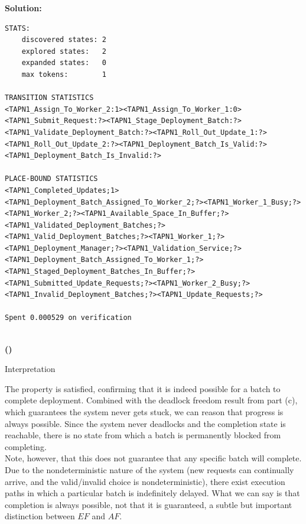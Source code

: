 \documentclass[10pt]{article}
\newenvironment{solution}{
	\vspace{1em}\par\large\textbf{{Solution:}}\par\vspace{1em}
}{
	\vspace{1em}
}
\newcounter{step}
\renewcommand{\thestep}{\Roman{step}}
\newenvironment{step}{
	\refstepcounter{step}
	\vspace{1.5em}\par\noindent\large\textbf{(\thestep)}
}{
	\par
	\vspace{1.5em}
}
\begin{document}
\begin{solution}
\begin{lstlisting}[style=queryoutput]
STATS:
	discovered states: 2
	explored states:   2
	expanded states:   0
	max tokens:        1

TRANSITION STATISTICS
<TAPN1_Assign_To_Worker_2:1><TAPN1_Assign_To_Worker_1:0><TAPN1_Submit_Request:?><TAPN1_Stage_Deployment_Batch:?><TAPN1_Validate_Deployment_Batch:?><TAPN1_Roll_Out_Update_1:?><TAPN1_Roll_Out_Update_2:?><TAPN1_Deployment_Batch_Is_Valid:?><TAPN1_Deployment_Batch_Is_Invalid:?>

PLACE-BOUND STATISTICS
<TAPN1_Completed_Updates;1><TAPN1_Deployment_Batch_Assigned_To_Worker_2;?><TAPN1_Worker_1_Busy;?><TAPN1_Worker_2;?><TAPN1_Available_Space_In_Buffer;?><TAPN1_Validated_Deployment_Batches;?><TAPN1_Valid_Deployment_Batches;?><TAPN1_Worker_1;?><TAPN1_Deployment_Manager;?><TAPN1_Validation_Service;?><TAPN1_Deployment_Batch_Assigned_To_Worker_1;?><TAPN1_Staged_Deployment_Batches_In_Buffer;?><TAPN1_Submitted_Update_Requests;?><TAPN1_Worker_2_Busy;?><TAPN1_Invalid_Deployment_Batches;?><TAPN1_Update_Requests;?>

Spent 0.000529 on verification


	\end{lstlisting}

	\begin{step}
		Interpretation
	\end{step}

	The property is satisfied, confirming that it is indeed possible for a batch to complete deployment. Combined with the deadlock freedom result from part (c), which guarantees the system never gets stuck, we can reason that progress is always possible. Since the system never deadlocks and the completion state is reachable, there is no state from which a batch is permanently blocked from completing. \\

	Note, however, that this does not guarantee that any specific batch will complete. Due to the nondeterministic nature of the system (new requests can continually arrive, and the valid/invalid choice is nondeterministic), there exist execution paths in which a particular batch is indefinitely delayed. What we can say is that completion is always possible, not that it is guaranteed, a subtle but important distinction between $EF$ and $AF$.

\end{solution}
\end{document}
